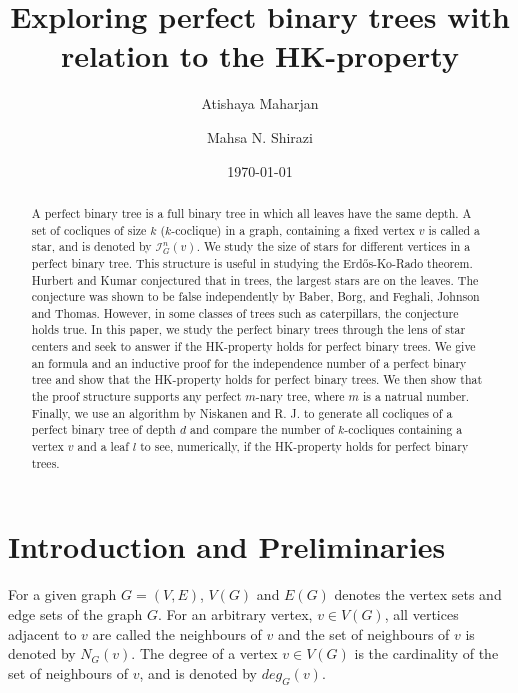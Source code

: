 \documentclass{amsart}
\title[]{Exploring perfect binary trees with relation to the HK-property}
\author[Atishaya Maharjan]{Atishaya Maharjan} \email[Atishaya Maharjan]{maharjaa@myumanitoba.ca}
\author[M.~N.~Shirazi]{Mahsa N. Shirazi} \email[M.~N.~Shirazi]{mahsa.nasrollahi@gmail.com}
\date{\today}
\theoremstyle{definition}
\begin{document}
\begin{abstract}
	A perfect binary tree is a full binary tree in which all leaves have the same depth. A set of cocliques of size $k$ ($k$-coclique) in a graph, containing a fixed vertex $v$ is called a star, and is denoted by $\mathcal{I}^n_G(v)$. We study the size of stars for different vertices in a perfect binary tree. This structure is useful in studying the Erd\H{o}s-Ko-Rado theorem. Hurbert and Kumar conjectured that in trees, the largest stars are on the leaves. The conjecture was shown to be false independently by Baber, Borg, and Feghali, Johnson and Thomas. However, in some classes of trees such as caterpillars, the conjecture holds true. In this paper, we study the perfect binary trees through the lens of star centers and seek to answer if the HK-property holds for perfect binary trees. We give an formula and an inductive proof for the independence number of a perfect binary tree and show that the HK-property holds for perfect binary trees. We then show that the proof structure supports any perfect $m$-nary tree, where $m$ is a natrual number. Finally, we use an algorithm by Niskanen and R. J. to generate all cocliques of a perfect binary tree of depth $d$ and compare the number of $k$-cocliques containing a vertex $v$ and a leaf $l$ to see, numerically, if the HK-property holds for perfect binary trees.
\end{abstract}

\maketitle

\section{Introduction and Preliminaries}
For a given graph $G = (V,E)$, $V(G)$ and $E(G)$ denotes the vertex sets and edge sets of the graph $G$. For an arbitrary vertex, $v \in V(G)$, all vertices adjacent to $v$ are called the neighbours of $v$ and the set of neighbours of $v$ is denoted by $N_G(v)$. The degree of a vertex $v \in V(G)$ is the cardinality of the set of neighbours of $v$, and is denoted by $deg_G(v)$.
\end{document}
